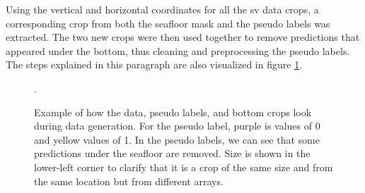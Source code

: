         Using the vertical and horizontal coordinates for all the \gls{sv} data crops, a corresponding crop from both the seafloor mask and the pseudo labels was extracted. The two new crops were then used together to remove predictions that appeared under the bottom, thus cleaning and preprocessing the pseudo labels. The steps explained in this paragraph are also visualized in figure \ref{crop_extract_fig}.
        \clearpage
        
        \begin{figure}[H]   
            \centering
            
            \caption[Data, label and bottom crop extraction and interaction]{Example of how the data, pseudo labels, and bottom crops look during data generation. For the pseudo label, purple is values of 0 and yellow values of 1. In the pseudo labels, we can see that some predictions under the seafloor are removed.  Size is shown in the lower-left corner to clarify that it is a crop of the same size and from the same location but from different arrays.}.
          	\medskip 
            \label{crop_extract_fig}
        \end{figure}
        
